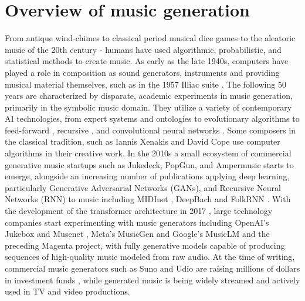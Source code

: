 \section{Overview of music generation} \label{section:music_generation_overview}
From antique wind-chimes to classical period musical dice games to the aleatoric music of the 20th century - humans have used algorithmic, probabilistic, and statistical methods to create music. As early as the late 1940s, computers have played a role in composition as sound generators, instruments \cite{France-Presse_2016} and providing musical material themselves, such as in the 1957 Illiac suite \cite{Hiller_Isaacson_1959}. The following 50 years are characterized by disparate, academic experiments in music generation, primarily in the symbolic music domain. They utilize a variety of contemporary AI technologies, from expert systems and ontologies \cite{Hiller_Isaacson_1959}\cite{Ebcioğlu_1994} to evolutionary algorithms \cite{Polito_Daida_Bersano-Begey_1997} to feed-forward \cite{Todd_1989}, recursive \cite{Mozer_1994}, and convolutional neural networks \cite{coconet}. Some composers in the classical tradition, such as Iannis Xenakis \cite{Xenakis_1992} and David Cope \cite{Cope_1989} use computer algorithms in their creative work. 
In the 2010s a small ecosystem of commercial generative music startups such as Jukedeck, PopGun, and Ampermusic \cite{Featherstone_2017} starts to emerge, alongside an increasing number of publications applying deep learning, particularly Generative Adversarial Networks (GANs), and Recursive Neural Networks (RNN) to music including MIDInet \cite{midinet}, DeepBach \cite{Hadjeres_Pachet_Nielsen_2017} and FolkRNN \cite{Sturm_Ben-Tal_2016}. With the development of the transformer architecture in 2017 \cite{Vaswani_Shazeer_Parmar_Uszkoreit_Jones_Gomez_Kaiser_Polosukhin_2017}, large technology companies start experimenting with music generators including OpenAI’s Jukebox \cite{Dhariwal_Jun_Payne_Kim_Radford_Sutskever_2020} and Musenet \cite{Christine_2019}, Meta’s MusicGen \cite{copet2023simple} and Google’s MusicLM \cite{Agostinelli_Denk_Borsos_Engel_Verzetti_Caillon_Huang_Jansen_Roberts_Tagliasacchi_et_al._2023} and the preceding Magenta project, with fully generative models capable of producing sequences of high-quality music modeled from raw audio. At the time of writing, commercial music generators such as Suno and Udio are raising millions of dollars in investment funds \cite{Stassen_2024}, while generated music is being widely streamed and actively used in TV and video productions. 

